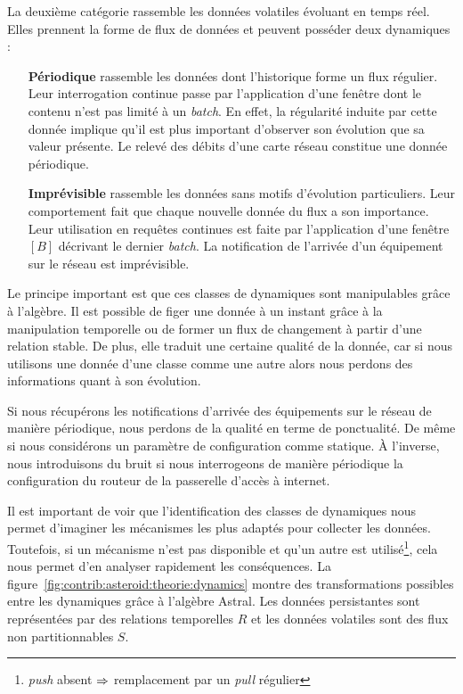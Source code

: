La deuxième catégorie rassemble les données volatiles évoluant en temps réel. Elles prennent la forme de flux de données et peuvent posséder deux dynamiques :
\begin{itemize}
	\item[\textbf{Périodique}] rassemble les données dont l'historique forme un flux régulier. Leur interrogation continue passe par l'application d'une fenêtre dont le contenu n'est pas limité à un \textit{batch}. En effet, la régularité induite par cette donnée implique qu'il est plus important d'observer son évolution que sa valeur présente. Le relevé des débits d'une carte réseau constitue une donnée périodique.
	\item[\textbf{Imprévisible}] rassemble les données sans motifs d'évolution particuliers. Leur comportement fait que chaque nouvelle donnée du flux a son importance. Leur utilisation en requêtes continues est faite par l'application d'une fenêtre $[B]$ décrivant le dernier \textit{batch}. La notification de l'arrivée d'un équipement sur le réseau est imprévisible.
\end{itemize}

Le principe important est que ces classes de dynamiques sont manipulables grâce à l'algèbre. Il est possible de figer une donnée à un instant grâce à la manipulation temporelle ou de former un flux de changement à partir d'une relation stable. De plus, elle traduit une certaine qualité de la donnée, car si nous utilisons une donnée d'une classe comme une autre alors nous perdons des informations quant à son évolution.
\begin{example}
	Si nous récupérons les notifications d'arrivée des équipements sur le réseau de manière périodique, nous perdons de la qualité en terme de ponctualité. De même si nous considérons un paramètre de configuration comme statique. À l'inverse, nous introduisons du bruit si nous interrogeons de manière périodique la configuration du routeur de la passerelle d'accès à internet.
\end{example}

Il est important de voir que l'identification des classes de dynamiques nous permet d'imaginer les mécanismes les plus adaptés pour collecter les données. Toutefois, si un mécanisme n'est pas disponible et qu'un autre est utilisé\footnote{\textit{push} absent $\Rightarrow$ remplacement par un \textit{pull} régulier}, cela nous permet d'en analyser rapidement les conséquences. La figure~\ref{fig:contrib:asteroid:theorie:dynamics} montre des transformations possibles entre les dynamiques grâce à l'algèbre Astral. Les données persistantes sont représentées par des relations temporelles $R$ et les données volatiles sont des flux non partitionnables $S$.

